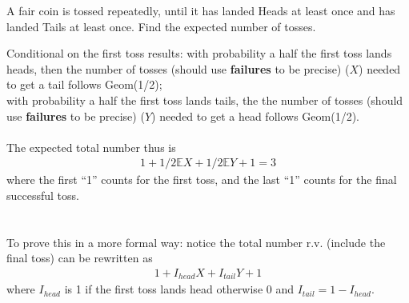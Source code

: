 
\setcounter{theorem}{17}
\begin{exercise} [BH.4.18] A fair coin is tossed repeatedly, until it has landed Heads at least once and has landed Tails at least once. Find the expected number of tosses.
\begin{solution}
    Conditional on the first toss results: with probability a half the first toss lands heads, then the number of tosses (should use \textbf{failures} to be precise) ($X$) needed to get a tail follows Geom(1/2);\\ with probability a half the first toss lands tails, the the number of tosses (should use \textbf{failures} to be precise) ($Y$) needed to get a head follows Geom(1/2). \\~\\
	The expected total number thus is 
	\begin{align*}
		1+ 1/2 \mathbb{E}X + 1/2 \mathbb{E}Y +1  =3
	\end{align*} 
	where the first ``1'' counts for the first toss, and the last ``1'' counts for the final successful toss. \\~\\
	~\\To prove this in a more formal way: notice the total number r.v. (include the final toss) can be rewritten as 
	\begin{align*}
		1 + I_{head} X + I_{tail} Y +1
	\end{align*}
where $I_{head}$ is 1 if the first toss lands head otherwise 0 and $ I_{tail}=1- I_{head}$.	
	

\end{solution}
\end{exercise}

